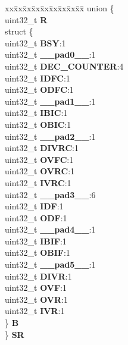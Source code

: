 \begin{DoxyCompactItemize}
\begin{tabbing}
\end{tabbing}\item 
\mbox{\label{structDECFIL__tag_ac53f54d31a100ec509fc003b12bd0d02}} 
\begin{tabbing}
xx\=xx\=xx\=xx\=xx\=xx\=xx\=xx\=xx\=\kill
union \{\\
\>uint32\_t {\bfseries R}\\
\>struct \{\\
\>\>uint32\_t {\bfseries BSY}:1\\
\>\>uint32\_t {\bfseries \_\_pad0\_\_}:1\\
\>\>uint32\_t {\bfseries DEC\_COUNTER}:4\\
\>\>uint32\_t {\bfseries IDFC}:1\\
\>\>uint32\_t {\bfseries ODFC}:1\\
\>\>uint32\_t {\bfseries \_\_pad1\_\_}:1\\
\>\>uint32\_t {\bfseries IBIC}:1\\
\>\>uint32\_t {\bfseries OBIC}:1\\
\>\>uint32\_t {\bfseries \_\_pad2\_\_}:1\\
\>\>uint32\_t {\bfseries DIVRC}:1\\
\>\>uint32\_t {\bfseries OVFC}:1\\
\>\>uint32\_t {\bfseries OVRC}:1\\
\>\>uint32\_t {\bfseries IVRC}:1\\
\>\>uint32\_t {\bfseries \_\_pad3\_\_}:6\\
\>\>uint32\_t {\bfseries IDF}:1\\
\>\>uint32\_t {\bfseries ODF}:1\\
\>\>uint32\_t {\bfseries \_\_pad4\_\_}:1\\
\>\>uint32\_t {\bfseries IBIF}:1\\
\>\>uint32\_t {\bfseries OBIF}:1\\
\>\>uint32\_t {\bfseries \_\_pad5\_\_}:1\\
\>\>uint32\_t {\bfseries DIVR}:1\\
\>\>uint32\_t {\bfseries OVF}:1\\
\>\>uint32\_t {\bfseries OVR}:1\\
\>\>uint32\_t {\bfseries IVR}:1\\
\>\} {\bfseries B}\\
\} {\bfseries SR}\\


\end{tabbing}
\end{DoxyCompactItemize}
